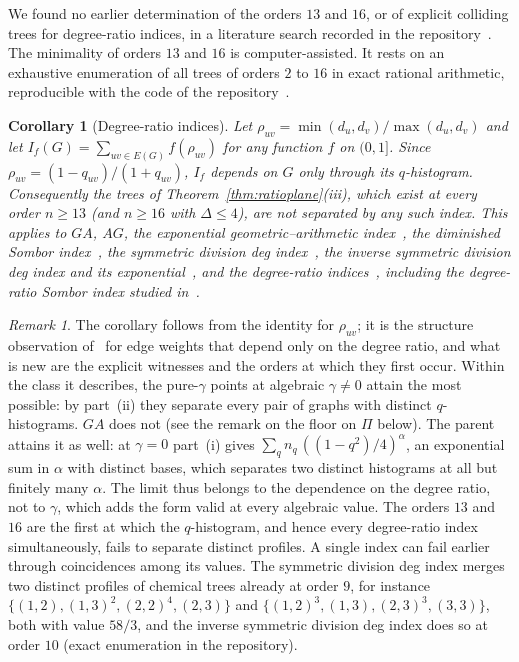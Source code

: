 \documentclass[a5paper, 10pt]{article}
\theoremstyle{plain}
\newtheorem*{corollary}{Corollary}
\theoremstyle{remark}
\newtheorem*{remark}{Remark}
\theoremstyle{definition}
\begin{document}
  We found no earlier determination of the orders $13$ and $16$, or of explicit colliding trees for degree-ratio indices, in a literature search recorded in the repository~\cite{LoyolaRepo}. The minimality of orders $13$ and $16$ is computer-assisted. It rests on an exhaustive enumeration of all trees of orders $2$ to $16$ in exact rational arithmetic, reproducible with the code of the repository~\cite{LoyolaRepo}.

  \begin{corollary}[Degree-ratio indices]\label{cor:ratioclass}
  Let $\rho_{uv} = \min(d_u,d_v)/\max(d_u,d_v)$ and let
  $I_f(G) = \sum_{uv \in E(G)} f(\rho_{uv})$ for any function
  $f$ on $(0,1]$. Since $\rho_{uv} = (1-q_{uv})/(1+q_{uv})$, $I_f$
  depends on $G$ only through its $q$-histogram. Consequently the trees of Theorem~\ref{thm:ratioplane}(iii), which
  exist at every order $n \ge 13$ (and $n \ge 16$ with $\Delta \le 4$),
  are not separated by any such index. This applies to $GA$, $AG$, the exponential geometric--arithmetic index~\cite{DasMondal2024ExpGA}, the diminished Sombor index~\cite{MovahediGutmanRedzepovicFurtula2026},
  the symmetric division deg index~\cite{VukicevicGasperov2010}, the
  inverse symmetric division deg index and its
  exponential~\cite{DasMondalRazaPal2025ExpISDD}, and the degree-ratio
  indices~\cite{NyauliBuragohain2027DRSO, GutmanBuragohainNyauli2026},
  including the degree-ratio Sombor index studied
  in~\cite{GutmanRedzepovicBuragohainNyauli2027, AliGutmanEtAl2027DRSO, ShaoJahanbani2027}.
  \end{corollary}

  \begin{remark}\label{rem:ratioclass}
  The corollary follows from the identity for $\rho_{uv}$; it is the structure observation of~\cite[Proposition~2.5]{Rada2019ExpVDB} for edge weights that depend only on the degree ratio, and what is new are the explicit witnesses and the orders at which they first occur. Within the
  class it describes, the pure-$\gamma$ points at algebraic
  $\gamma \neq 0$ attain the most possible: by part~(ii) they separate
  every pair of graphs with distinct $q$-histograms. $GA$ does not
  (see the remark on the floor on $\Pi$ below). The parent attains it as well: at
  $\gamma = 0$ part~(i) gives $\sum_q n_q\,((1-q^2)/4)^{\alpha}$, an
  exponential sum in $\alpha$ with distinct bases, which separates two
  distinct histograms at all but finitely many $\alpha$. The limit thus
  belongs to the dependence on the degree ratio, not to $\gamma$, which
  adds the form valid at every algebraic value. The orders $13$ and $16$ are the first at which the $q$-histogram, and
  hence every degree-ratio index simultaneously, fails to separate
  distinct profiles. A single index can fail earlier through coincidences
  among its values. The symmetric division deg index merges two distinct
  profiles of chemical trees already at order $9$, for instance
  $\{(1,2), (1,3)^{2}, (2,2)^{4}, (2,3)\}$ and
  $\{(1,2)^{3}, (1,3), (2,3)^{3}, (3,3)\}$, both with value $58/3$, and the
  inverse symmetric division deg index does so at order $10$ (exact
  enumeration in the repository).
  \end{remark}
\end{document}
